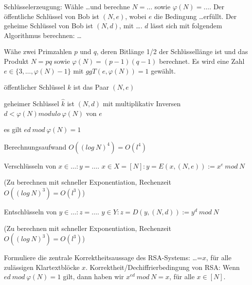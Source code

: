 \documentclass[avery5371, frame]{flashcards}
\begin{document}
\begin{flashcard}{Schlüsselerzeugung: Wähle \dots und berechne $N=\dots$ sowie $\varphi(N)=\dots$. Der öffentliche Schlüssel von Bob ist $(N,e)$, wobei $e$ die Bedingung \dots erfüllt. Der geheime Schlüssel von Bob ist $(N,d)$, mit \dots. $d$ lässt sich mit folgendem Algorithmus berechnen: \dots}

    Wähe zwei Primzahlen $p$ und $q$, deren Bitlänge 1/2 der Schlüssellänge ist und das Produkt $N=pq$ sowie $\varphi(N)=(p-1)(q-1)$ berechnet.
    Es wird eine Zahl $e\in\{3,\dots,\varphi(N)-1\}$ mit $ggT(e,\varphi(N)) = 1$ gewählt.

    \begin{itemize*}
        \item öffentlicher Schlüssel $k$ ist das Paar $(N,e)$
        \item geheimer Schlüssel $\hat{k}$ ist $(N,d)$ mit multiplikativ Inversen $d<\varphi(N) modulo\ \varphi(N)$ von $e$
        \item es gilt $ed\ mod\ \varphi(N) = 1$
        \item Berechnungsaufwand $O((log\ N)^4) =O(l^4)$
    \end{itemize*}
\end{flashcard}

\begin{flashcard}{Verschlüsseln von $x\in \dots :y=\dots $.}
    $x\in X= [N]: y=E(x,(N,e)) :=x^e\ mod\ N$

    (Zu berechnen mit schneller Exponentiation, Rechenzeit $O((log\ N)^3) =O(l^3)$)
\end{flashcard}

\begin{flashcard}{Entschlüsseln von $y\in \dots :z=\dots $.}
    $y\in Y: z=D(y,(N,d)) :=y^d\ mod\ N$

    (Zu berechnen mit schneller Exponentiation, Rechenzeit $O((log\ N)^3) =O(l^3)$)
\end{flashcard}

\begin{flashcard}{Formuliere die zentrale Korrektheitsaussage des RSA-Systems: \dots=$x$, für alle zulässigen Klartextblöcke $x$.}
    Korrektheit/Dechiffrierbedingung von RSA: Wenn $ed\ mod\ \varphi(N) = 1$ gilt, dann haben wir $x^{ed}\ mod\ N=x$, für alle $x\in [N]$.
\end{flashcard}
\end{document}
